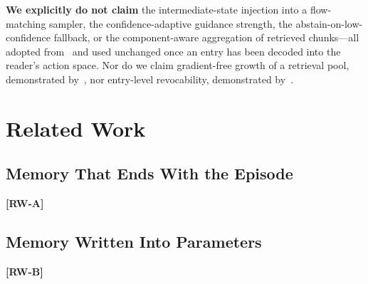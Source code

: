 \documentclass[letterpaper, 10 pt, conference]{ieeeconf}
\newcommand{\todo}[1]{\textbf{[#1]}}
\begin{document}
\noindent\textbf{We explicitly do not claim} the intermediate-state injection
into a flow-matching sampler, the confidence-adaptive guidance strength, the
abstain-on-low-confidence fallback, or the component-aware aggregation of
retrieved chunks---all adopted from~\cite{rts} and used unchanged once an entry
has been decoded into the reader's action space. Nor do we claim gradient-free
growth of a retrieval pool, demonstrated by~\cite{recap}, nor entry-level
revocability, demonstrated by~\cite{clare}.

\section{Related Work}
\label{sec:related}

\subsection{Memory That Ends With the Episode}
\todo{RW-A}

\subsection{Memory Written Into Parameters}
\todo{RW-B}
\end{document}
